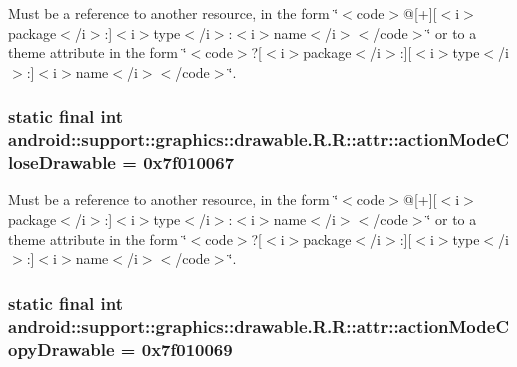 Must be a reference to another resource, in the form \char`\"{}$<$code$>$@\mbox{[}+\mbox{]}\mbox{[}$<$i$>$package$<$/i$>$:\mbox{]}$<$i$>$type$<$/i$>$:$<$i$>$name$<$/i$>$$<$/code$>$\char`\"{} or to a theme attribute in the form \char`\"{}$<$code$>$?\mbox{[}$<$i$>$package$<$/i$>$:\mbox{]}\mbox{[}$<$i$>$type$<$/i$>$:\mbox{]}$<$i$>$name$<$/i$>$$<$/code$>$\char`\"{}. \hypertarget{classandroid_1_1support_1_1graphics_1_1drawable_1_1_r_1_1attr_8ef40e5ea04bfd46ed1ccb33e4d583d8}{
\subsubsection[{actionModeCloseDrawable}]{\setlength{\rightskip}{0pt plus 5cm}static final int android::support::graphics::drawable.R.R::attr::actionModeCloseDrawable = 0x7f010067}}
\label{classandroid_1_1support_1_1graphics_1_1drawable_1_1_r_1_1attr_8ef40e5ea04bfd46ed1ccb33e4d583d8}


Must be a reference to another resource, in the form \char`\"{}$<$code$>$@\mbox{[}+\mbox{]}\mbox{[}$<$i$>$package$<$/i$>$:\mbox{]}$<$i$>$type$<$/i$>$:$<$i$>$name$<$/i$>$$<$/code$>$\char`\"{} or to a theme attribute in the form \char`\"{}$<$code$>$?\mbox{[}$<$i$>$package$<$/i$>$:\mbox{]}\mbox{[}$<$i$>$type$<$/i$>$:\mbox{]}$<$i$>$name$<$/i$>$$<$/code$>$\char`\"{}. \hypertarget{classandroid_1_1support_1_1graphics_1_1drawable_1_1_r_1_1attr_ddc24b993610bd82edd6fc99f29be673}{
\subsubsection[{actionModeCopyDrawable}]{\setlength{\rightskip}{0pt plus 5cm}static final int android::support::graphics::drawable.R.R::attr::actionModeCopyDrawable = 0x7f010069}}
\label{classandroid_1_1support_1_1graphics_1_1drawable_1_1_r_1_1attr_ddc24b993610bd82edd6fc99f29be673}


